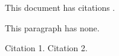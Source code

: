 \documentclass{article}
\begin{document}
This \cite{A1} document has citations \cite{B2}.

This paragraph has none.
\begin{thebibliography}{2}
Citation 1.
Citation 2.
\end{thebibliography}
\end{document}
